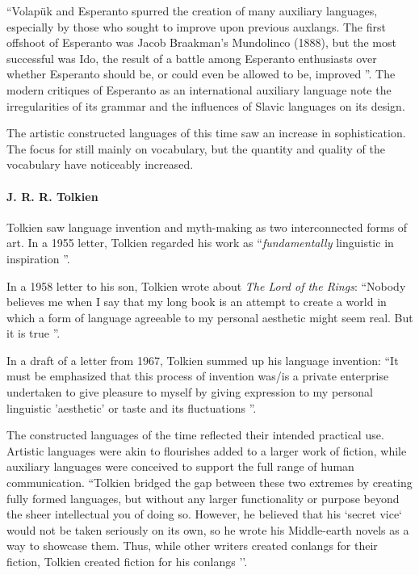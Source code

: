 \documentclass[14pt, a4paper]{extreport}
\begin{document}
``Volapük and Esperanto spurred the creation of many auxiliary languages, especially by those who sought to improve upon previous auxlangs. The first offshoot of Esperanto was Jacob Braakman's Mundolinco (1888), but the most successful was Ido, the result of a battle among Esperanto enthusiasts over whether Esperanto should be, or could even be allowed to be, improved \parencite{sanders}''. The modern critiques of Esperanto as an international auxiliary language note the irregularities of its grammar and the influences of Slavic languages on its design.

The artistic constructed languages of this time saw an increase in sophistication. The focus for still mainly on vocabulary, but the quantity and quality of the vocabulary have noticeably increased.
        \paragraph{J. R. R. Tolkien}
Tolkien saw language invention and myth-making as two interconnected forms of art. In a 1955 letter, Tolkien regarded his work as ``\textit{fundamentally} linguistic in inspiration \parencite[233]{letters}''.

In a 1958 letter to his son, Tolkien wrote about \textit{The Lord of the Rings}: ``Nobody believes me when I say that my long book is an attempt to create a world in which a form of language agreeable to my personal aesthetic might seem real. But it is true \parencite[285]{letters}''.

In a draft of a letter from 1967, Tolkien summed up his language invention: ``It must be emphasized that this process of invention was/is a private enterprise undertaken to give pleasure to myself by giving expression to my personal linguistic 'aesthetic' or taste and its fluctuations \parencite[411]{letters}''.

The constructed languages of the time reflected their intended practical use. Artistic languages were akin to flourishes added to a larger work of fiction, while auxiliary languages were conceived to support the full range of human communication. ``Tolkien bridged the gap between these two extremes by creating fully formed languages, but without any larger functionality or purpose beyond the sheer intellectual you of doing so. However, he believed that his `secret vice` would not be taken seriously on its own, so he wrote his Middle-earth novels as a way to showcase them. Thus, while other writers created conlangs for their fiction, Tolkien created fiction for his conlangs \parencite{sanders}''.
\end{document}
